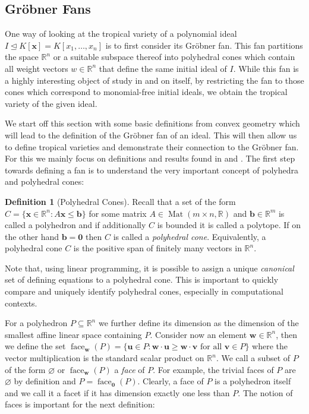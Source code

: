 \documentclass[
  paper=a4,
  titlepage,
  bibliography=totoc,
  listof=totoc,
  pagesize=pdftex
]{scrartcl}
\numberwithin{figure}{section}
\numberwithin{equation}{section}
\numberwithin{table}{section}
\newcommand*\setR{\mathds{R}}
\let\vec\mathbf
\let\idealof\trianglelefteq
\DeclareMathOperator{\Mat}{Mat}
\DeclareMathOperator{\face}{face}
\theoremstyle{definition}
\newtheorem{definition}{Definition}
\numberwithin{definition}{section}
\begin{document}
\subsection{Gröbner Fans}
\label{sec:grobFan}

One way of looking at the tropical variety of a polynomial ideal $I \idealof K[\vec x] =
K[x_1, \dots, x_n]$ is to first consider its Gröbner fan. This fan partitions the space
$\setR^n$ or a suitable subspace thereof into polyhedral cones which contain all weight
vectors $w\in \setR^n$ that define the same initial ideal of $I$. While this fan is a
highly interesting object of study in and on itself, by restricting the fan to those cones
which correspond to monomial-free initial ideals, we obtain the tropical variety of the
given ideal.

We start off this section with some basic definitions from convex geometry which will lead
to the definition of the Gröbner fan of an ideal. This will then allow us to define
tropical varieties and demonstrate their connection to the Gröbner fan. For this we mainly
focus on definitions and results found in \cite{compGrobFan} and \cite{SturmGBCP}. The
first step towards defining a fan is to understand the very important concept of polyhedra
and polyhedral cones:

\begin{definition}[Polyhedral Cones]
  \label{def:polyhedralCone}
  Recall that a set of the form $C = \{ \vec x \in \setR^n : A\vec x \leq \vec b \}$ for
  some matrix $A \in \Mat(m\times n, \setR)$ and $\vec b \in \setR^m$ is called a
  polyhedron and if additionally $C$ is bounded it is called a polytope. If on the other
  hand $\vec b = \vec 0$ then $C$ is called a \emph{polyhedral cone}. Equivalently, a
  polyhedral cone $C$ is the positive span of finitely many vectors in $\setR^n$.
\end{definition}

Note that, using linear programming, it is possible to assign a unique \emph{canonical}
set of defining equations to a polyhedral cone. This is important to quickly compare and
uniquely identify polyhedral cones, especially in computational contexts.

For a polyhedron $P \subseteq \setR^n$ we further define its dimension as the dimension of
the smallest affine linear space containing $P$. Consider now an element $\vec w \in
\setR^n$, then we define the set $\face_{\vec w}(P) = \{ \vec u \in P : \vec w\cdot \vec u
\geq \vec w \cdot \vec v \text{ for all } \vec v\in P\}$ where the vector multiplication
is the standard scalar product on $\setR^n$. We call a subset of $P$ of the form
$\varnothing$ or $\face_{\vec w}(P)$ a \emph{face} of $P$. For example, the trivial faces
of $P$ are $\varnothing$ by definition and $P = \face_{\vec 0}(P)$. Clearly, a face of $P$
is a polyhedron itself and we call it a facet if it has dimension exactly one less than
$P$. The notion of faces is important for the next definition:
\end{document}

